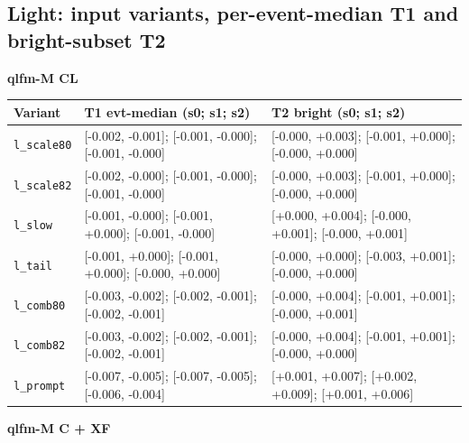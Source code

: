 \documentclass[10pt,a4paper]{article}
\begin{document}
\subsection{Light: input variants, per-event-median T1 and bright-subset T2}
\textbf{qlfm-M CL}

\begin{center}\small
\setlength{\tabcolsep}{3pt}\renewcommand{\arraystretch}{1.15}
\begin{tabularx}{\linewidth}{LLL}
\toprule
\textbf{Variant} & \textbf{T1 evt-median (s0; s1; s2)} & \textbf{T2 bright (s0; s1; s2)} \\
\midrule
\texttt{l\_\allowbreak{}scale80} & [-0.002, -0.001]; [-0.001, -0.000]; [-0.001, -0.000] & [-0.000, +0.003]; [-0.001, +0.000]; [-0.000, +0.000] \\
\texttt{l\_\allowbreak{}scale82} & [-0.002, -0.000]; [-0.001, -0.000]; [-0.001, -0.000] & [-0.000, +0.003]; [-0.001, +0.000]; [-0.000, +0.000] \\
\texttt{l\_\allowbreak{}slow} & [-0.001, -0.000]; [-0.001, +0.000]; [-0.001, -0.000] & [+0.000, +0.004]; [-0.000, +0.001]; [-0.000, +0.001] \\
\texttt{l\_\allowbreak{}tail} & [-0.001, +0.000]; [-0.001, +0.000]; [-0.000, +0.000] & [-0.000, +0.000]; [-0.003, +0.001]; [-0.000, +0.000] \\
\texttt{l\_\allowbreak{}comb80} & [-0.003, -0.002]; [-0.002, -0.001]; [-0.002, -0.001] & [-0.000, +0.004]; [-0.001, +0.001]; [-0.000, +0.001] \\
\texttt{l\_\allowbreak{}comb82} & [-0.003, -0.002]; [-0.002, -0.001]; [-0.002, -0.001] & [-0.000, +0.004]; [-0.001, +0.001]; [-0.000, +0.000] \\
\texttt{l\_\allowbreak{}prompt} & [-0.007, -0.005]; [-0.007, -0.005]; [-0.006, -0.004] & [+0.001, +0.007]; [+0.002, +0.009]; [+0.001, +0.006] \\
\bottomrule
\end{tabularx}
\end{center}
\textbf{qlfm-M C + XF}
\end{document}

